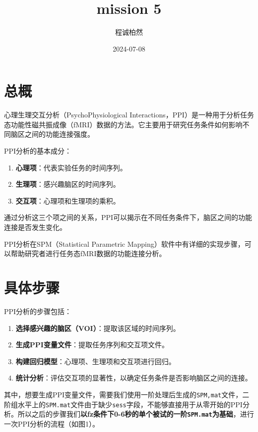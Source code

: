 \documentclass[
]{article}
\title{mission 5}
\author{程诚柏然}
\date{2024-07-08}
\providecommand{\tightlist}{%
  \setlength{\itemsep}{0pt}\setlength{\parskip}{0pt}}
\begin{document}
\maketitle

{
\setcounter{tocdepth}{2}
\tableofcontents
}
\hypertarget{ux603bux6982}{%
\section{总概}\label{ux603bux6982}}

心理生理交互分析（PsychoPhysiological
Interactions，PPI）是一种用于分析任务态功能性磁共振成像（fMRI）数据的方法。它主要用于研究任务条件如何影响不同脑区之间的功能连接强度。

PPI分析的基本成分：

\begin{enumerate}
\def\labelenumi{\arabic{enumi}.}
\tightlist
\item
  \textbf{心理项}：代表实验任务的时间序列。
\item
  \textbf{生理项}：感兴趣脑区的时间序列。
\item
  \textbf{交互项}：心理项和生理项的乘积。
\end{enumerate}

通过分析这三个项之间的关系，PPI可以揭示在不同任务条件下，脑区之间的功能连接是否发生变化。

PPI分析在SPM（Statistical Parametric
Mapping）软件中有详细的实现步骤，可以帮助研究者进行任务态fMRI数据的功能连接分析。

\hypertarget{ux5177ux4f53ux6b65ux9aa4}{%
\section{具体步骤}\label{ux5177ux4f53ux6b65ux9aa4}}

PPI分析的步骤包括：

\begin{enumerate}
\def\labelenumi{\arabic{enumi}.}
\tightlist
\item
  \textbf{选择感兴趣的脑区（VOI）}：提取该区域的时间序列。
\item
  \textbf{生成PPI变量文件}：提取任务序列和交互项文件。
\item
  \textbf{构建回归模型}：心理项、生理项和交互项进行回归。
\item
  \textbf{统计分析}：评估交互项的显著性，以确定任务条件是否影响脑区之间的连接。
\end{enumerate}

其中，想要生成PPI变量文件，需要我们使用一阶处理后生成的\texttt{SPM,mat}文件，二阶组水平上的\texttt{SPM.mat}文件由于缺少\texttt{sess}字段，不能够直接用于从零开始的PPI分析。所以之后的步骤我们\textbf{以fz条件下0-6秒的单个被试的一阶\texttt{SPM.mat}为基础}，进行一次PPI分析的流程（如图1）。
\end{document}
